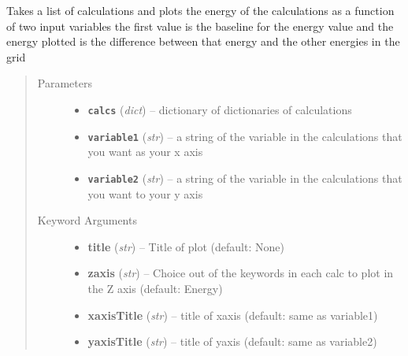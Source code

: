 \documentclass[letterpaper,10pt,english]{sphinxmanual}
\begin{document}

\begin{fulllineitems}
\label{plot:plot.interpolatePlot}
Takes a list of calculations and plots the energy of the calculations as a function of two input variables
the first value is the baseline for the energy value and the energy plotted is the difference between that
energy and the other energies in the grid
\begin{quote}\begin{description}
\item[{Parameters}] \leavevmode\begin{itemize}
\item {} 
\textbf{\texttt{calcs}} (\emph{dict}) -- dictionary of dictionaries of calculations

\item {} 
\textbf{\texttt{variable1}} (\emph{str}) -- a string of the variable in the calculations that you want as your x axis

\item {} 
\textbf{\texttt{variable2}} (\emph{str}) -- a string of the variable in the calculations that you want to your y axis

\end{itemize}

\item[{Keyword Arguments}] \leavevmode\begin{itemize}
\item {} 
\textbf{title} (\emph{str}) --
Title of plot (default: None)

\item {} 
\textbf{zaxis} (\emph{str}) --
Choice out of the keywords in each calc to plot in the Z axis (default: Energy)

\item {} 
\textbf{xaxisTitle} (\emph{str}) --
title of xaxis (default: same as variable1)

\item {} 
\textbf{yaxisTitle} (\emph{str}) --
title of yaxis (default: same as variable2)


\end{itemize}
\end{description}
\end{quote}
\end{fulllineitems}
\end{document}
